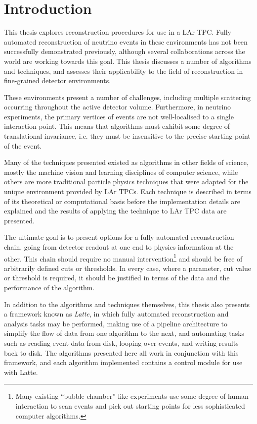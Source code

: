 \chapter{Introduction}
This thesis explores reconstruction procedures for use in a \ac{LAr TPC}. Fully automated reconstruction of neutrino events in these environments has not been successfully demonstrated previously, although several collaborations across the world are working towards this goal. This thesis discusses a number of algorithms and techniques, and assesses their applicability to the field of reconstruction in fine-grained detector environments.

These environments present a number of challenges, including multiple scattering occurring throughout the active detector volume. Furthermore, in neutrino experiments, the primary vertices of events are not well-localised to a single interaction point. This means that algorithms must exhibit some degree of translational invariance, i.e. they must be insensitive to the precise starting point of the event.

Many of the techniques presented existed as algorithms in other fields of science, mostly the machine vision and learning disciplines of computer science, while others are more traditional particle physics techniques that were adapted for the unique environment provided by \acs{LAr TPC}s. Each technique is described in terms of its theoretical or computational basis before the implementation details are explained and the results of applying the technique to \acs{LAr TPC} data are presented.

The ultimate goal is to present options for a fully automated reconstruction chain, going from detector readout at one end to physics information at the other. This chain should require no manual intervention\footnote{Many existing ``bubble chamber''-like experiments use some degree of human interaction to scan events and pick out starting points for less sophisticated computer algorithms.} and should be free of arbitrarily defined cuts or thresholds. In every case, where a parameter, cut value or threshold is required, it should be justified in terms of the data and the performance of the algorithm.

In addition to the algorithms and techniques themselves, this thesis also presents a framework known as \emph{Latte}, in which fully automated reconstruction and analysis tasks may be performed, making use of a pipeline architecture to simplify the flow of data from one algorithm to the next, and automating tasks such as reading event data from disk, looping over events, and writing results back to disk. The algorithms presented here all work in conjunction with this framework, and each algorithm implemented contains a control module for use with Latte.

